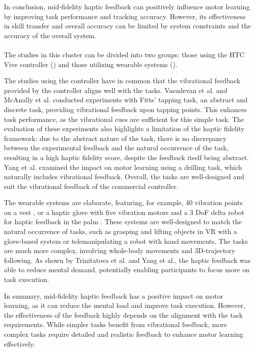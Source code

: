In conclusion, mid-fidelity haptic feedback can positively influence motor learning by improving task performance and tracking accuracy. However, its effectiveness in skill transfer and overall accuracy can be limited by system constraints and the accuracy of the overall system.


\paragraph{}
The studies in this cluster can be divided into two groups: those using the HTC Vive controller (\cite{Vasudevan2020, Yang2023, McAnally2023}) and those utilizing wearable systems (\cite{LiuH2019, Trinitatova2023, Xia2023}).

The studies using the controller have in common that the vibrational feedback provided by the controller aligns well with the tasks. Vasudevan et al. and McAnally et al. conducted experiments with Fitts' tapping task, an abstract and discrete task, providing vibrational feedback upon tapping points. This enhances task performance, as the vibrational cues are sufficient for this simple task. The evaluation of these experiments also highlights a limitation of the haptic fidelity framework: due to the abstract nature of the task, there is no discrepancy between the experimental feedback and the natural occurrence of the task, resulting in a high haptic fidelity score, despite the feedback itself being abstract. Yang et al. examined the impact on motor learning using a drilling task, which naturally includes vibrational feedback. Overall, the tasks are well-designed and suit the vibrational feedback of the commercial controller.

The wearable systems are elaborate, featuring, for example, 40 vibration points on a vest \cite{Xia2023}, or a haptic glove with five vibration motors and a 3 DoF delta robot for haptic feedback in the palm \cite{Trinitatova2023}. These systems are well-designed to match the natural occurrence of tasks, such as grasping and lifting objects in VR with a glove-based system or telemanipulating a robot with hand movements. The tasks are much more complex, involving whole-body movements and 3D-trajectory following. As shown by Trinitatova et al. and Yang et al., the haptic feedback was able to reduce mental demand, potentially enabling participants to focus more on task execution.

In summary, mid-fidelity haptic feedback has a positive impact on motor learning, as it can reduce the mental load and improve task execution. However, the effectiveness of the feedback highly depends on the alignment with the task requirements. While simpler tasks benefit from vibrational feedback, more complex tasks require detailed and realistic feedback to enhance motor learning effectively.


